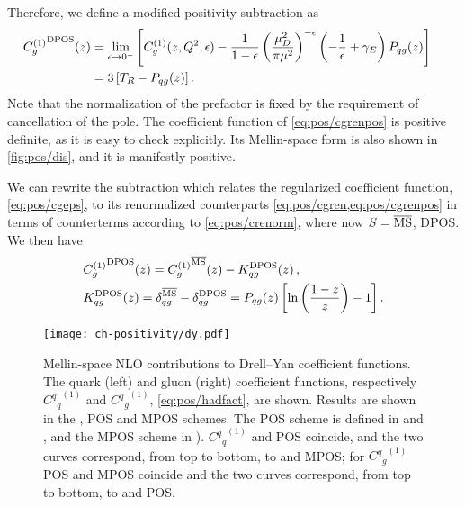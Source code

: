 Therefore, we define a modified positivity subtraction as
\begin{align}\label{eq:pos/cgrenpos}
  \hspace*{-1em}{C^{(1)}_{g}}^{\textrm{DPOS}}(z) &= \lim_{\epsilon\to0^-}
  \left[{C^{(1)}_{g}}(z,Q^2,\epsilon) - \frac{1}{1-\epsilon}\left(\frac{\mu_D^2}{\pi\mu^2}\right)^{-\epsilon} \left(-\frac 1
    {\epsilon}+\gamma_E\right) P_{qg}(z)\right]\\\label{eq:pos/cgrenpos1}
    &= 3\left[T_R- P_{qg}(z)\right].
\end{align}
Note that the normalization of the prefactor is fixed by the
requirement of cancellation of the pole.
The coefficient function of \cref{eq:pos/cgrenpos} is positive definite,
as it is easy to check explicitly. Its Mellin-space form is also shown
in \cref{fig:pos/dis}, and it is manifestly positive.

We
can rewrite the subtraction which relates  the regularized
coefficient function, \cref{eq:pos/cgeps}, to its renormalized
counterparts \cref{eq:pos/cgren,eq:pos/cgrenpos} in terms of
counterterms according to \cref{eq:pos/crenorm}, where now
$S={\overline{\textrm{MS}}}$, DPOS.
We then have 
\begin{align}\label{eq:pos/count}
  &   {C^{(1)}_{g}}^{\textrm{DPOS}}(z) =  {C^{(1)}_{g}}^{{\overline{\textrm{MS}}}}(z) -
  K_{qg}^{\textrm{DPOS}}(z) \,,\\ \label{eq:pos/count1}
  &  K_{qg}^{\textrm{DPOS}}(z)=\delta_{qg}^{{\overline{\textrm{MS}}}}-\delta_{qg}^{\textrm{DPOS}}=  P_{qg}(z)\left[\ln\left(\frac{1-z}{z}\right) - 1\right].
\end{align}


\begin{figure}[t]
  \begin{center}
    \texttt{[image: ch-positivity/dy.pdf]}
    \caption{\small Mellin-space NLO contributions to Drell--Yan coefficient
      functions. The quark (left) and gluon (right) coefficient
      functions, respectively  ${{{C^q}_q}^{(1)}}$ and  ${{{C^q}_g}^{(1)}}$, \cref{eq:pos/hadfact}, are
      shown.
      Results are shown in the \msbar{}, POS and MPOS schemes. The POS
      scheme is defined in 
      and , and the MPOS scheme
      in ).
 ${{{C^q}_q}^{(1)}}$ \msbar{} and POS coincide, and the two curves
      correspond, from top to bottom, to \msbar{} and MPOS; for  
      ${{{C^q}_g}^{(1)}}$ POS and MPOS coincide and the two curves
      correspond, from top to bottom, to \msbar{} and POS. 
    \label{fig:pos/dy} }
  \end{center}
\end{figure}
